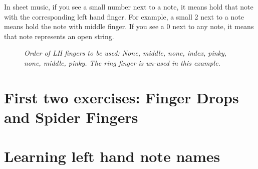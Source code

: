 In sheet music, if you see a small number next to a note, it means hold that note with the corresponding left hand finger. For example, a small 2 next to a note means hold the note with middle finger. If you see a 0 next to any note, it means that note represents an open string.

\begin{figure}[h]
	\begin{center}
		\large
		\caption{\textit{Order of LH fingers to be used: None, middle, none, index, pinky, none, middle, pinky. The ring finger is un-used in this example.}}
	\end{center}
\end{figure}

\section{First two exercises: Finger Drops and Spider Fingers}

\section{Learning left hand note names}
